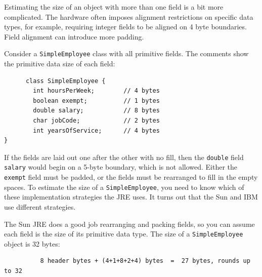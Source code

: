 Estimating the size of an object with more than one field is a bit more complicated. The hardware often imposes alignment restrictions on specific data types, for example, requiring integer fields to be aligned on 4 byte boundaries. Field alignment can introduce more padding.
 
\begin{example}
Consider a \texttt{SimpleEmployee} class with all primitive fields. The comments show the primitive data size of each field:
\begin{verbatim}
      class SimpleEmployee {
        int hoursPerWeek;        // 4 bytes 
        boolean exempt;          // 1 bytes
        double salary;           // 8 bytes
        char jobCode;            // 2 bytes
        int yearsOfService;      // 4 bytes	
}
\end{verbatim}
If the fields are laid out one after the other with no fill, then the \texttt{double} field \texttt{salary} would begin on a 5-byte boundary, which is not allowed. Either the \texttt{exempt} field must be padded, or the fields must be rearranged to fill in the empty spaces. To estimate the size of a \texttt{SimpleEmployee}, you need to know which of these implementation strategies the JRE uses. It turns out that the Sun and IBM use different strategies.
\end{example}
The Sun JRE does a good job rearranging and packing fields, so you can assume each field is the size of its primitive data type. The size of a \texttt{SimpleEmployee} object is 32 bytes:
\begin{verbatim}               
          8 header bytes + (4+1+8+2+4) bytes  =  27 bytes, rounds up to 32
\end{verbatim} 

